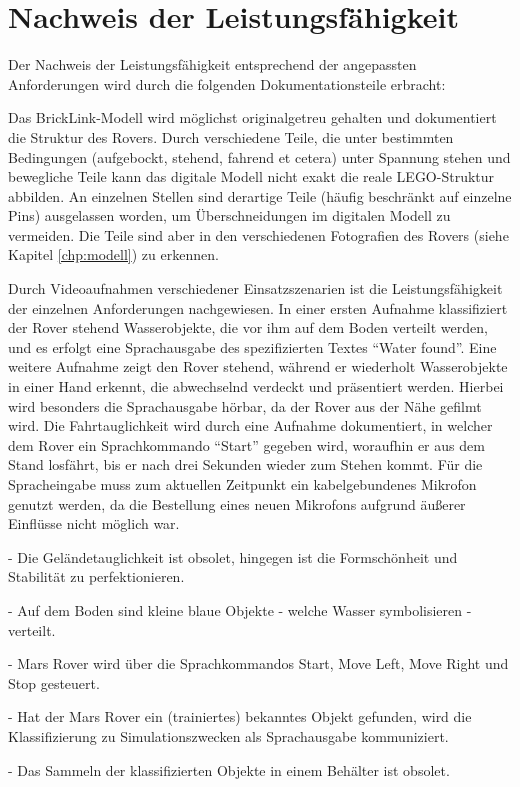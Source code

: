 \chapter{Nachweis der Leistungsfähigkeit}
\label{chp:nachweis_leistungsfaehigkeit}

Der Nachweis der Leistungsfähigkeit entsprechend der angepassten Anforderungen wird durch die folgenden Dokumentationsteile erbracht:

Das BrickLink-Modell wird möglichst originalgetreu gehalten und dokumentiert die Struktur des Rovers.
Durch verschiedene Teile, die unter bestimmten Bedingungen (aufgebockt, stehend, fahrend et cetera) unter Spannung stehen und bewegliche Teile kann das digitale Modell nicht exakt die reale LEGO-Struktur abbilden.
An einzelnen Stellen sind derartige Teile (häufig beschränkt auf einzelne Pins) ausgelassen worden, um Überschneidungen im digitalen Modell zu vermeiden.
Die Teile sind aber in den verschiedenen Fotografien des Rovers (siehe Kapitel \ref{chp:modell}) zu erkennen.

Durch Videoaufnahmen verschiedener Einsatzszenarien ist die Leistungsfähigkeit der einzelnen Anforderungen nachgewiesen.
In einer ersten Aufnahme klassifiziert der Rover stehend Wasserobjekte, die vor ihm auf dem Boden verteilt werden, und es erfolgt eine Sprachausgabe des spezifizierten Textes \enquote{Water found}.
Eine weitere Aufnahme zeigt den Rover stehend, während er wiederholt Wasserobjekte in einer Hand erkennt, die abwechselnd verdeckt und präsentiert werden.
Hierbei wird besonders die Sprachausgabe hörbar, da der Rover aus der Nähe gefilmt wird.
Die Fahrtauglichkeit wird durch eine Aufnahme dokumentiert, in welcher dem Rover ein Sprachkommando \enquote{Start} gegeben wird, woraufhin er aus dem Stand losfährt, bis er nach drei Sekunden wieder zum Stehen kommt.
Für die Spracheingabe muss zum aktuellen Zeitpunkt ein kabelgebundenes Mikrofon genutzt werden, da die Bestellung eines neuen Mikrofons aufgrund äußerer Einflüsse nicht möglich war.

- Die Geländetauglichkeit ist obsolet, hingegen ist die Formschönheit und Stabilität zu perfektionieren.

- Auf dem Boden sind kleine blaue Objekte - welche Wasser symbolisieren - verteilt.

- Mars Rover wird über die Sprachkommandos Start, Move Left, Move Right und Stop gesteuert.

- Hat der Mars Rover ein (trainiertes) bekanntes Objekt gefunden, wird die Klassifizierung zu Simulationszwecken als Sprachausgabe kommuniziert.

- Das Sammeln der klassifizierten Objekte in einem Behälter ist obsolet.